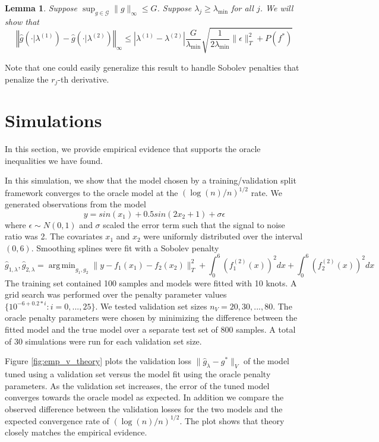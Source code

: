 \documentclass[12pt]{article}
\newtheorem{lemma}{Lemma}
\DeclareMathOperator*{\argmin}{arg\,min}
\begin{document}
\begin{lemma}
\label{lemma:sobolev}
Suppose $\sup_{g \in \mathcal{G}} \|g\|_\infty \le G$.
Suppose $\lambda_j \ge \lambda_{\min}$ for all $j$.
We will show that
\begin{equation}
\left\Vert \hat{g}(\cdot|\lambda^{(1)}) - \hat{g}(\cdot|\lambda^{(2)}) \right\Vert _{\infty} 
\le
|\lambda^{(1)}-\lambda^{(2)}| \frac{G}{\lambda_{\min}} \sqrt{\frac{1}{2\lambda_{\min}}\|\epsilon\|_{T}^{2}+P(f^{*})}
\end{equation}
\end{lemma}
Note that one could easily generalize this result to handle Sobolev penalties that penalize the $r_j$-th derivative.

\section{Simulations}\label{sec:simulations}

In this section, we provide empirical evidence that supports the oracle inequalities we have found.

In this simulation, we show that the model chosen by a training/validation split framework converges to the oracle model at the $(\log(n)/n)^{1/2}$ rate. We generated observations from the model
\begin{equation}
y = sin(x_1) + 0.5 sin(2 x_2 + 1) + \sigma \epsilon
\end{equation}
where $\epsilon \sim N(0,1)$ and $\sigma$ scaled the error term such that the signal to noise ratio was 2.
The covariates $x_1$ and $x_2$ were uniformly distributed over the interval $(0,6)$.
Smoothing splines were fit with a Sobolev penalty
\begin{equation}
\hat{g}_{1, \lambda}, \hat{g}_{2, \lambda} = \argmin_{g_1, g_2} \| y - f_1(x_1) - f_2(x_2) \|_T^2 + \int_0^6 (f_1^{(2)}(x))^2 dx + \int_0^6 (f_2^{(2)}(x))^2 dx
\end{equation}
The training set contained 100 samples and models were fitted with 10 knots. A grid search was performed over the penalty parameter values $\{10^{-6 + 0.2 * i}: i = 0, ..., 25 \}$. We tested validation set sizes $n_V = 20, 30, ..., 80$. The oracle penalty parameters were chosen by minimizing the difference between the fitted model and the true model over a separate test set of 800 samples. A total of 30 simulations were run for each validation set size.

Figure \ref{fig:emp_v_theory} plots the validation loss $\| \hat{g}_{\lambda} - g^* \|_V$ of the model tuned using a validation set versus the model fit using the oracle penalty parameters. As the validation set increases, the error of the tuned model converges towards the oracle model as expected. In addition we compare the observed difference between the validation losses for the two models and the expected convergence rate of $(\log(n)/n)^{1/2}$. The plot shows that theory closely matches the empirical evidence.
\end{document}
